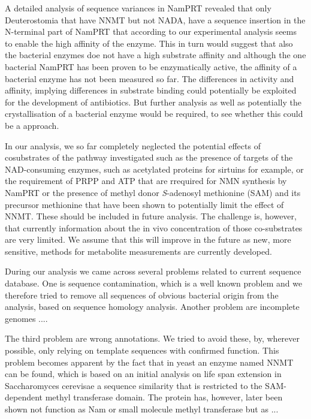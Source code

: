 A detailed analysis of sequence variances in NamPRT revealed that only Deuterostomia that have NNMT but not NADA, have a sequence insertion in the N-terminal part of NamPRT that according to our experimental analysis seems to enable the high affinity of the enzyme. This in turn would suggest that also the bacterial enzymes doe not have a high substrate affinity and although the one bacterial NamPRT has been proven to be enzymatically active, the affinity of a bacterial enzyme has not been measured so far. The differences in activity and affinity, implying differences in substrate binding could potentially be exploited for the development of  antibiotics. But further analysis as well as potentially the crystallisation of a bacterial enzyme would be required, to see whether this could be a  approach. 

In our analysis, we so far completely neglected the potential effects of cosubstrates of the pathway investigated such as the presence of targets of the NAD-consuming enzymes, such as acetylated proteins for sirtuins for example, or the requirement of PRPP and ATP that are rrequired for NMN synthesis by NamPRT  or the presence of methyl donor \textit{S}-adenosyl methionine (SAM) and its precursor methionine that have been shown to potentially limit the effect of NNMT\cite{PMID:23455543 }. These should be included in future analysis. The challenge is, however, that currently information about the in vivo concentration of those co-substrates are very limited. We assume that this will improve in the future as new, more sensitive, methods for metabolite measurements are currently developed.

During our analysis we came across several problems related to current sequence database. One is sequence contamination, which is a well known problem and we therefore tried to remove all sequences of obvious bacterial origin from the analysis, based on sequence homology analysis. Another problem are incomplete genomes .... 

The third problem are wrong annotations. We tried to avoid these, by, wherever possible, only relying on template sequences with confirmed function. This problem becomes apparent by the fact that in yeast an enzyme named NNMT can be found, which is based on an initial analysis on life span extension in Saccharomyces cerevisae a sequence similarity that is restricted to the SAM-dependent methyl transferase domain.  The protein has, however, later been shown not function as Nam or small molecule methyl transferase but as ...

